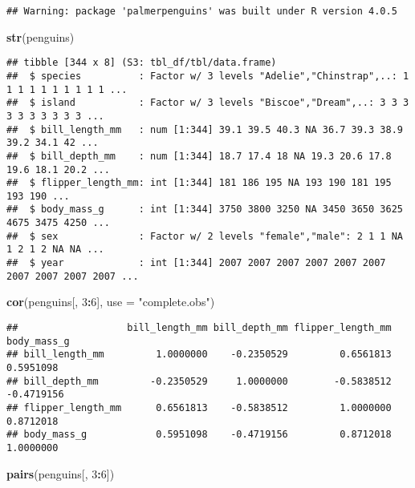 \documentclass[
]{book}
\newenvironment{Shaded}{\begin{snugshade}}{\end{snugshade}}
\newcommand{\DataTypeTok}[1]{\textcolor[rgb]{0.13,0.29,0.53}{#1}}
\newcommand{\DecValTok}[1]{\textcolor[rgb]{0.00,0.00,0.81}{#1}}
\newcommand{\KeywordTok}[1]{\textcolor[rgb]{0.13,0.29,0.53}{\textbf{#1}}}
\newcommand{\NormalTok}[1]{#1}
\newcommand{\OperatorTok}[1]{\textcolor[rgb]{0.81,0.36,0.00}{\textbf{#1}}}
\newcommand{\StringTok}[1]{\textcolor[rgb]{0.31,0.60,0.02}{#1}}
\begin{document}
\begin{verbatim}
## Warning: package 'palmerpenguins' was built under R version 4.0.5
\end{verbatim}

\begin{Shaded}
\begin{Highlighting}[]
\KeywordTok{str}\NormalTok{(penguins)}
\end{Highlighting}
\end{Shaded}

\begin{verbatim}
## tibble [344 x 8] (S3: tbl_df/tbl/data.frame)
##  $ species          : Factor w/ 3 levels "Adelie","Chinstrap",..: 1 1 1 1 1 1 1 1 1 1 ...
##  $ island           : Factor w/ 3 levels "Biscoe","Dream",..: 3 3 3 3 3 3 3 3 3 3 ...
##  $ bill_length_mm   : num [1:344] 39.1 39.5 40.3 NA 36.7 39.3 38.9 39.2 34.1 42 ...
##  $ bill_depth_mm    : num [1:344] 18.7 17.4 18 NA 19.3 20.6 17.8 19.6 18.1 20.2 ...
##  $ flipper_length_mm: int [1:344] 181 186 195 NA 193 190 181 195 193 190 ...
##  $ body_mass_g      : int [1:344] 3750 3800 3250 NA 3450 3650 3625 4675 3475 4250 ...
##  $ sex              : Factor w/ 2 levels "female","male": 2 1 1 NA 1 2 1 2 NA NA ...
##  $ year             : int [1:344] 2007 2007 2007 2007 2007 2007 2007 2007 2007 2007 ...
\end{verbatim}

\begin{Shaded}
\begin{Highlighting}[]
\KeywordTok{cor}\NormalTok{(penguins[, }\DecValTok{3}\OperatorTok{:}\DecValTok{6}\NormalTok{], }\DataTypeTok{use =} \StringTok{"complete.obs"}\NormalTok{)}
\end{Highlighting}
\end{Shaded}

\begin{verbatim}
##                   bill_length_mm bill_depth_mm flipper_length_mm body_mass_g
## bill_length_mm         1.0000000    -0.2350529         0.6561813   0.5951098
## bill_depth_mm         -0.2350529     1.0000000        -0.5838512  -0.4719156
## flipper_length_mm      0.6561813    -0.5838512         1.0000000   0.8712018
## body_mass_g            0.5951098    -0.4719156         0.8712018   1.0000000
\end{verbatim}

\begin{Shaded}
\begin{Highlighting}[]
\KeywordTok{pairs}\NormalTok{(penguins[, }\DecValTok{3}\OperatorTok{:}\DecValTok{6}\NormalTok{])}
\end{Highlighting}
\end{Shaded}
\end{document}
